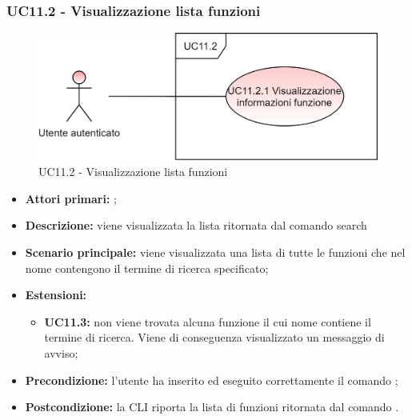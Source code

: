 \subsubsection{UC11.2 - Visualizzazione lista funzioni}
\begin{figure}[H]
	\centering
	\includegraphics[scale=\ucs]{./res/img/UC11-2.png}
	\caption {UC11.2 - Visualizzazione lista funzioni}
\end{figure}
\begin{itemize}
	\item \textbf{Attori primari:} \ua{};
	\item \textbf{Descrizione:} viene visualizzata la lista ritornata dal comando search
	\item \textbf{Scenario principale:} viene visualizzata una lista di tutte le funzioni che nel nome contengono il termine di ricerca specificato;
	\item \textbf{Estensioni:} 
	\begin{itemize}
		\item \textbf{UC11.3:} non viene trovata alcuna funzione il cui nome contiene il termine di ricerca. Viene di conseguenza visualizzato un messaggio di avviso;
	\end{itemize}
	\item \textbf{Precondizione:} l’utente ha inserito ed eseguito correttamente il comando \search{};
	\item \textbf{Postcondizione:} la CLI riporta la lista di funzioni ritornata dal comando \search{}.
\end{itemize}